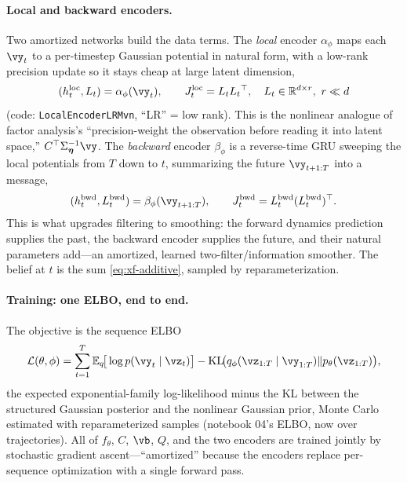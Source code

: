 \documentclass[11pt]{article}
\theoremstyle{plain}
\theoremstyle{definition}
\theoremstyle{remark}
\theoremstyle{definition}
\newcommand{\E}{\mathbb{E}}
\newcommand{\veta}{\bm{\eta}}
\begin{document}
\paragraph{Local and backward encoders.} Two amortized networks build the data
terms. The \emph{local} encoder $\alpha_{\phi}$ maps each $\vy_t$ to a per-timestep
Gaussian potential in natural form, with a low-rank precision update so it stays
cheap at large latent dimension,
\begin{equation}\label{eq:xf-local}
    (h_t^{\mathrm{loc}}, L_t) = \alpha_{\phi}(\vy_t), \qquad
    J_t^{\mathrm{loc}} = L_t L_t\trp, \quad L_t\in\reals^{d\times r},\ r\ll d
\end{equation}
(code: \texttt{LocalEncoderLRMvn}, ``LR'' = low rank). This is the nonlinear
analogue of factor analysis's ``precision-weight the observation before reading it
into latent space,'' $C\trp\Sigma_{\veta}^{-1}\vy$. The \emph{backward} encoder
$\beta_{\phi}$ is a reverse-time GRU sweeping the local potentials from $T$ down to
$t$, summarizing the future $\vy_{t+1:T}$ into a message,
\begin{equation}\label{eq:xf-backward}
    (h_t^{\mathrm{bwd}}, L_t^{\mathrm{bwd}}) = \beta_{\phi}(\vy_{t+1:T}), \qquad
    J_t^{\mathrm{bwd}} = L_t^{\mathrm{bwd}} (L_t^{\mathrm{bwd}})\trp .
\end{equation}
This is what upgrades filtering to smoothing: the forward dynamics prediction
supplies the past, the backward encoder supplies the future, and their natural
parameters add---an amortized, learned two-filter/information smoother. The belief
at $t$ is the sum \eqref{eq:xf-additive}, sampled by reparameterization.

\paragraph{Training: one ELBO, end to end.} The objective is the sequence ELBO
\begin{equation}\label{eq:xf-elbo}
    \mathcal{L}(\theta, \phi) = \sum_{t=1}^T \E_{q}\!\big[\log p(\vy_t\mid\vz_t)\big]
        - \mathrm{KL}\!\big(q_{\phi}(\vz_{1:T}\mid\vy_{1:T})\Vert p_{\theta}(\vz_{1:T})\big) ,
\end{equation}
the expected exponential-family log-likelihood minus the KL between the structured
Gaussian posterior and the nonlinear Gaussian prior, Monte Carlo estimated with
reparameterized samples (notebook 04's ELBO, now over trajectories). All of
$f_{\theta}$, $C$, $\vb$, $Q$, and the two encoders are trained jointly by
stochastic gradient ascent---``amortized'' because the encoders replace
per-sequence optimization with a single forward pass.
\end{document}
